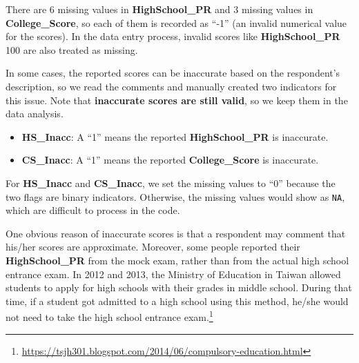 \documentclass[
]{article}
\newenvironment{Shaded}{\begin{snugshade}}{\end{snugshade}}
\newcommand{\CommentTok}[1]{\textcolor[rgb]{0.56,0.35,0.01}{\textit{#1}}}
\newcommand{\DecValTok}[1]{\textcolor[rgb]{0.00,0.00,0.81}{#1}}
\newcommand{\FunctionTok}[1]{\textcolor[rgb]{0.00,0.00,0.00}{#1}}
\newcommand{\NormalTok}[1]{#1}
\newcommand{\OtherTok}[1]{\textcolor[rgb]{0.56,0.35,0.01}{#1}}
\newcommand{\SpecialCharTok}[1]{\textcolor[rgb]{0.00,0.00,0.00}{#1}}
\newcommand{\StringTok}[1]{\textcolor[rgb]{0.31,0.60,0.02}{#1}}
\providecommand{\tightlist}{%
  \setlength{\itemsep}{0pt}\setlength{\parskip}{0pt}}
\begin{document}
There are 6 missing values in \textbf{HighSchool\_PR} and 3 missing
values in \textbf{College\_Score}, so each of them is recorded as ``-1''
(an invalid numerical value for the scores). In the data entry process,
invalid scores like \textbf{HighSchool\_PR} 100 are also treated as
missing.

In some cases, the reported scores can be inaccurate based on the
respondent's description, so we read the comments and manually created
two indicators for this issue. Note that \textbf{inaccurate scores are
still valid}, so we keep them in the data analysis.

\begin{itemize}
\tightlist
\item
  \textbf{HS\_Inacc}: A ``1'' means the reported \textbf{HighSchool\_PR}
  is inaccurate.
\item
  \textbf{CS\_Inacc}: A ``1'' means the reported \textbf{College\_Score}
  is inaccurate.
\end{itemize}

For \textbf{HS\_Inacc} and \textbf{CS\_Inacc}, we set the missing values
to ``0'' because the two flags are binary indicators. Otherwise, the
missing values would show as \texttt{NA}, which are difficult to process
in the code.

\begin{Shaded}
\end{Shaded}

One obvious reason of inaccurate scores is that a respondent may comment
that his/her scores are approximate. Moreover, some people reported
their \textbf{HighSchool\_PR} from the mock exam, rather than from the
actual high school entrance exam. In 2012 and 2013, the Ministry of
Education in Taiwan allowed students to apply for high schools with
their grades in middle school. During that time, if a student got
admitted to a high school using this method, he/she would not need to
take the high school entrance exam.\footnote{\url{https://tsjh301.blogspot.com/2014/06/compulsory-education.html}}
\end{document}
